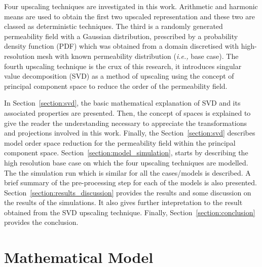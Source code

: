 \documentclass[preprint,12pt]{elsarticle}
\newcommand{\ie}{{\it i.e., }}
\begin{document}
Four upscaling techniques are investigated in this work. Arithmetic and harmonic means are used to obtain the first two upscaled representation and these two are classed as deterministic techniques. The third is a randomly generated permeability field with a Gaussian distribution, prescribed by a probability density function (PDF) which was obtained from a domain discretised with high-resolution mesh with known permeability distribution (\ie  base case). The fourth upscaling technique is the crux of this research, it introduces singular value decomposition (SVD) as a method of upscaling using the concept of principal component space to reduce the order of the permeability field.

In Section~\ref{section:svd}, the basic mathematical explanation of SVD and its associated properties are presented. Then, the concept of spaces is explained to give the reader the understanding necessary to appreciate the transformations and projections involved in this work. Finally, the Section~\ref{section:svd} describes model order space reduction for the permeability field within the principal component space. Section~\ref{section:model_simulation}, starts by describing the high resolution base case on which the four upscaling techniques are modelled. The the simulation run which is similar for all the cases/models is described. A brief summary of the pre-processing step for each of the models is also presented. Section~\ref{section:results_discussion} provides the results and some discussion on the results of the simulations. It also gives further intepretation to the result obtained from the SVD upscaling technique. Finally, Section~\ref{section:conclusion} provides the conclusion.

\section{Mathematical Model}\label{section:mathematical_model}
\end{document}
